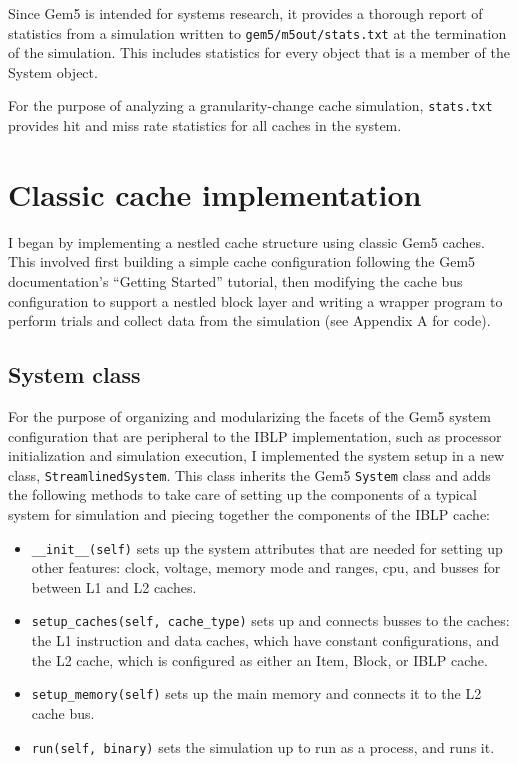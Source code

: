 \documentclass[12pt,twoside]{reedthesis}
\begin{document}
	Since Gem5 is intended for systems research, it provides a thorough report of statistics from a simulation written to \verb`gem5/m5out/stats.txt` at the termination of the simulation. This includes statistics for every object that is a member of the System object.

	For the purpose of analyzing a granularity-change cache simulation, \verb`stats.txt` provides hit and miss rate statistics for all caches in the system.

\section{Classic cache implementation}

	I began by implementing a nestled cache structure using classic Gem5 caches. This involved first building a simple cache configuration following the Gem5 documentation's ``Getting Started'' tutorial, then modifying the cache bus configuration to support a nestled block layer and writing a wrapper program to perform trials and collect data from the simulation (see Appendix A for code).

	\subsection*{System class}

	For the purpose of organizing and modularizing the facets of the Gem5 system configuration that are peripheral to the IBLP implementation, such as processor initialization and simulation execution, I implemented the system setup in a new class, \verb`StreamlinedSystem`. This class inherits the Gem5 \verb`System` class and adds the following methods to take care of setting up the components of a typical system for simulation and piecing together the components of the IBLP cache:

	\begin{itemize}
		\item \verb`__init__(self)` sets up the system attributes that are needed for setting up other features: clock, voltage, memory mode and ranges, cpu, and busses for between L1 and L2 caches.
	
		\item \verb`setup_caches(self, cache_type)` sets up and connects busses to the caches: the L1 instruction and data caches, which have constant configurations, and the L2 cache, which is configured as either an Item, Block, or IBLP cache.
	
		\item \verb`setup_memory(self)` sets up the main memory and connects it to the L2 cache bus.
	
		\item \verb`run(self, binary)` sets the simulation up to run as a process, and runs it.
	\end{itemize}
\end{document}
